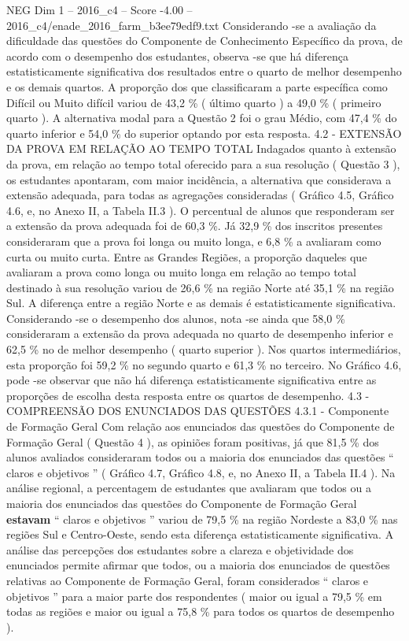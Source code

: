 \begin{textsample}{NEG Dim 1 – 2016\_c4 – Score -4.00 – 2016\_c4/enade\_2016\_farm\_b3ee79edf9.txt}
Considerando -se a avaliação da dificuldade das questões do Componente de Conhecimento Específico da prova, de acordo com o desempenho dos estudantes, observa -se que há diferença estatisticamente significativa dos resultados entre o quarto de melhor desempenho e os demais quartos.
A proporção dos que classificaram a parte específica como Difícil ou Muito difícil variou de 43,2 \% ( último quarto ) a 49,0 \% ( primeiro quarto ).
A alternativa modal para a Questão 2 foi o grau Médio, com 47,4 \% do quarto inferior e 54,0 \% do superior optando por esta resposta. 4.2 - EXTENSÃO DA PROVA EM RELAÇÃO AO TEMPO TOTAL Indagados quanto à extensão da prova, em relação ao tempo total oferecido para a sua resolução ( Questão 3 ), os estudantes apontaram, com maior incidência, a alternativa que considerava a extensão adequada, para todas as agregações consideradas ( Gráfico 4.5, Gráfico 4.6, e, no Anexo II, a Tabela II.3 ).
O percentual de alunos que responderam ser a extensão da prova adequada foi de 60,3 \%.
Já 32,9 \% dos inscritos presentes consideraram que a prova foi longa ou muito longa, e 6,8 \% a avaliaram como curta ou muito curta.
Entre as Grandes Regiões, a proporção daqueles que avaliaram a prova como longa ou muito longa em relação ao tempo total destinado à sua resolução variou de 26,6 \% na região Norte até 35,1 \% na região Sul.
A diferença entre a região Norte e as demais é estatisticamente significativa.
Considerando -se o desempenho dos alunos, nota -se ainda que 58,0 \% consideraram a extensão da prova adequada no quarto de desempenho inferior e 62,5 \% no de melhor desempenho ( quarto superior ).
Nos quartos intermediários, esta proporção foi 59,2 \% no segundo quarto e 61,3 \% no terceiro.
No Gráfico 4.6, pode -se observar que não há diferença estatisticamente significativa entre as proporções de escolha desta resposta entre os quartos de desempenho. 4.3 - COMPREENSÃO DOS ENUNCIADOS DAS QUESTÕES 4.3.1 - Componente de Formação Geral Com relação aos enunciados das questões do Componente de Formação Geral ( Questão 4 ), as opiniões foram positivas, já que 81,5 \% dos alunos avaliados consideraram todos ou a maioria dos enunciados das questões “ claros e objetivos ” ( Gráfico 4.7, Gráfico 4.8, e, no Anexo II, a Tabela II.4 ).
Na análise regional, a percentagem de estudantes que avaliaram que todos ou a maioria dos enunciados das questões do Componente de Formação Geral \textbf{estavam} “ claros e objetivos ” variou de 79,5 \% na região Nordeste a 83,0 \% nas regiões Sul e Centro-Oeste, sendo esta diferença estatisticamente significativa.
A análise das percepções dos estudantes sobre a clareza e objetividade dos enunciados permite afirmar que todos, ou a maioria dos enunciados de questões relativas ao Componente de Formação Geral, foram considerados “ claros e objetivos ” para a maior parte dos respondentes ( maior ou igual a 79,5 \% em todas as regiões e maior ou igual a 75,8 \% para todos os quartos de desempenho ).

\end{textsample}
